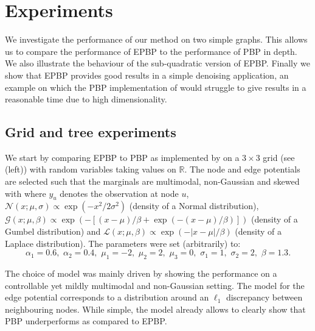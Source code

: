 
\section{Experiments}

We investigate the performance of our method on two simple graphs. This allows us to compare the performance of EPBP to the performance of PBP in depth. We also illustrate the behaviour of the sub-quadratic version of EPBP. Finally we show that EPBP provides good results in a simple denoising application, an example on which the PBP implementation of \citet{ihler09} would struggle to give results in a reasonable time due to high dimensionality.

\subsection{Grid and tree experiments}
We start by comparing EPBP to PBP as implemented by \citet{ihler09} on a $3\times 3$ grid (see  (left)) with random variables taking values on $\mathbb R$. The node and edge potentials are selected such that the marginals are multimodal, non-Gaussian and skewed with
where $y_{u}$ denotes the observation at node $u$, $\mathcal N(x;\mu,\sigma)\propto \exp(-x^{2}/2\sigma^{2})$ (density of a Normal distribution), $\mathcal G(x;\mu,\beta)\propto \exp(-[(x-\mu)/\beta+\exp(-(x-\mu)/\beta)])$ (density of a Gumbel distribution) and $\mathcal L(x;\mu,\beta)\propto \exp(-|x-\mu|/\beta)$ (density of a Laplace distribution). The parameters were set (arbitrarily) to:
$$ \alpha_{1}=0.6,\,\, \alpha_{2}=0.4,\,\, \mu_{1}=-2,\,\,\mu_{2}=2,\,\,\mu_{3}=0, \,\,\sigma_{1}=1, \,\,\sigma_{2}=2, \,\,\beta=1.3. $$

The choice of model was mainly driven by showing the performance on a controllable yet mildly multimodal and non-Gaussian setting.
The model for the edge potential corresponds to a distribution around an $\ell_{1}$ discrepancy between neighbouring nodes.
While simple, the model already allows to clearly show that PBP underperforms as compared to EPBP.

